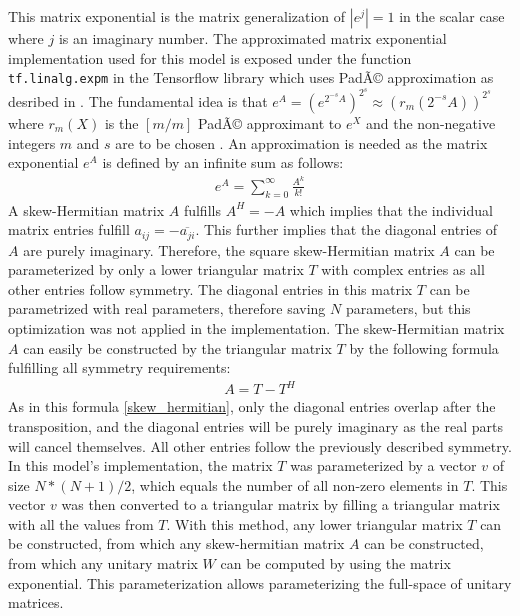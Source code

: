 \documentclass[draft,final]{vutinfth} %
\begin{document}
    This matrix exponential is the matrix generalization of $|e^j|=1$ in the scalar case where $j$ is an imaginary number.
    The approximated matrix exponential implementation used for this model is exposed under the function \texttt{tf.linalg.expm} in the Tensorflow library \cite{Tensorflow} which uses PadÃ© approximation as desribed in \cite{expm}.
    The fundamental idea is that $e^A = (e^{2^{-s}A})^{2^s} \approx (r_m(2^{-s}A))^{2^s}$ where $r_m(X)$ is the $[m/m]$ PadÃ© approximant to $e^X$ and the non-negative integers $m$ and $s$ are to be chosen \cite[p. 1]{expm}.
    An approximation is needed as the matrix exponential $e^A$ is defined by an infinite sum as follows:
    \begin{align}
    \label{expm_definition}
    e^A = \sum_{k=0}^{\infty} \frac{A^k}{k!}
    \end{align}
    A skew-Hermitian matrix $A$ fulfills $A^H = -A$ which implies that the individual matrix entries fulfill $a_{ij} = -\overline{a_{ji}}$. 
    This further implies that the diagonal entries of $A$ are purely imaginary.
    Therefore, the square skew-Hermitian matrix $A$ can be parameterized by only a lower triangular matrix $T$ with complex entries as all other entries follow symmetry.
    The diagonal entries in this matrix $T$ can be parametrized with real parameters, therefore saving $N$ parameters, but this optimization was not applied in the implementation.
    The skew-Hermitian matrix $A$ can easily be constructed by the triangular matrix $T$ by the following formula fulfilling all symmetry requirements:
    \begin{align}
    \label{skew_hermitian}
    A = T - T^H
    \end{align}
    As in this formula \ref{skew_hermitian}, only the diagonal entries overlap after the transposition, and the diagonal entries will be purely imaginary as the real parts will cancel themselves.
    All other entries follow the previously described symmetry.
    In this model's implementation, the matrix $T$ was parameterized by a vector $v$ of size $N*(N+1)/2$, which equals the number of all non-zero elements in $T$.
    This vector $v$ was then converted to a triangular matrix by filling a triangular matrix with all the values from $T$.
    With this method, any lower triangular matrix $T$ can be constructed, from which any skew-hermitian matrix $A$ can be constructed, from which any unitary matrix $W$ can be computed by using the matrix exponential.
    This parameterization allows parameterizing the full-space of unitary matrices. 
\end{document}
